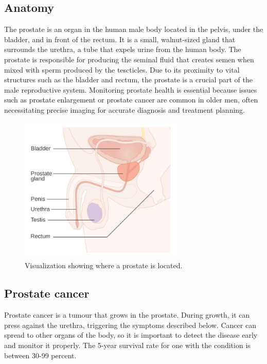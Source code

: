 \subsection{Anatomy}
The prostate is an organ in the human male body located in the pelvis, under the bladder, and in front of the rectum. It is a small, walnut-sized gland that surrounds the urethra, a tube that expels urine from the human body. The prostate is responsible for producing the seminal fluid that creates semen when mixed with sperm produced by the tescticles.
Due to its proximity to vital structures such as the bladder and rectum, the prostate is a crucial part of the male reproductive system. Monitoring prostate health is essential because issues such as prostate enlargement or prostate cancer are common in older men, often necessitating precise imaging for accurate diagnosis and treatment planning.
\begin{figure}[h]
\centering
\includegraphics[width=0.7\textwidth]{background/Diagram_showing_the_position_of_the_prostate_and_rectum_CRUK_358.svg.png}
\caption{Visualization showing where a prostate is located\cite{prostate-rectum-image}.}
\end{figure}

\newpage
\subsection{Prostate cancer}
Prostate cancer is a tumour that grows in the prostate. During growth, it can press against the urethra, triggering the symptoms described below.
Cancer can spread to other organs of the body, so it is important to detect the disease early and monitor it properly. 
The 5-year survival rate for one with the condition is between 30-99 percent.

